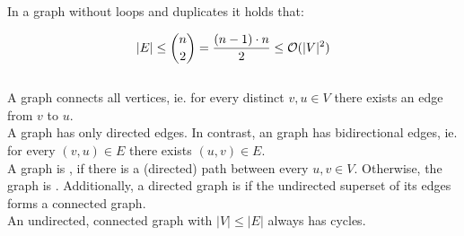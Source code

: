\documentclass[a3paper, landscape, 11pt]{article} %
\begin{document}
\begin{multicols*}{4}
{In a graph without loops and duplicates it holds that:

$$
|E| \le \binom{n}{2} = \frac{(n-1) \cdot n}{2} \le \mathcal{O}(|V|^2) 
$$\\

A  graph connects all vertices, ie. for every distinct $v,u \in V$ there exists an edge from $v$ to $u$.\\

A  graph has only directed edges. In contrast, an  graph has bidirectional edges, ie. for every $(v,u)\in E$ there exists $(u,v)\in E$.\\

A graph is , if there is a \nolinebreak(directed) path between every $u,v \in V$. Otherwise, the graph is . Additionally, a directed graph is  if the undirected superset of its edges forms a connected graph.\\

An undirected, connected graph with $|V| \le |E|$ always has cycles.\\

}
\end{multicols*}
\end{document}
